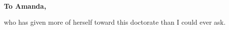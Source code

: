 \newpage
\thispagestyle{plain}
~
\vspace{2in}

\begin{center}
\large 
\textbf{To Amanda,}
\vspace{.3in}

\normalsize
who has given more of herself toward this doctorate than I could ever ask.
\end{center}
